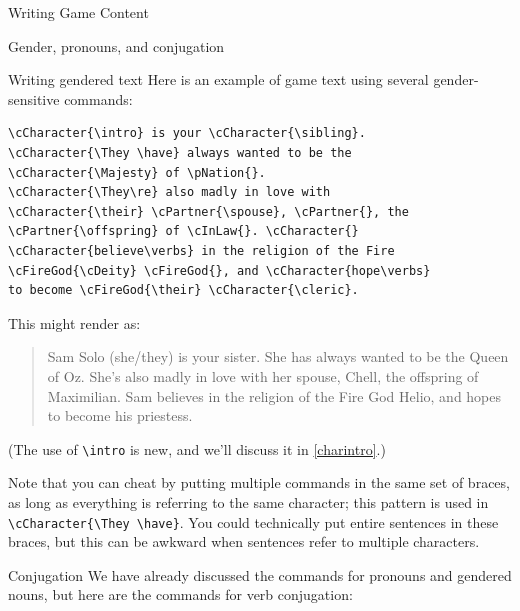 \documentclass[sheet]{GameTexBase}
\begin{document}
\begin{section}{Writing Game Content}
\begin{subsection}{Gender, pronouns, and conjugation}
\begin{subsubsection}{Writing gendered text}
Here is an example of game text using several gender-sensitive commands:

\begin{verbatim}
\cCharacter{\intro} is your \cCharacter{\sibling}.
\cCharacter{\They \have} always wanted to be the
\cCharacter{\Majesty} of \pNation{}.  
\cCharacter{\They\re} also madly in love with 
\cCharacter{\their} \cPartner{\spouse}, \cPartner{}, the 
\cPartner{\offspring} of \cInLaw{}. \cCharacter{} 
\cCharacter{believe\verbs} in the religion of the Fire
\cFireGod{\cDeity} \cFireGod{}, and \cCharacter{hope\verbs}
to become \cFireGod{\their} \cCharacter{\cleric}.
\end{verbatim} 

This might render as:

\begin{quote}
Sam Solo (she/they) is your sister.  She has always wanted to be the Queen of Oz.  She's also madly in love with her spouse, Chell, the offspring of Maximilian.  Sam believes in the religion of the Fire God Helio, and hopes to become his priestess.
\end{quote}

(The use of \lstinline|\intro| is new, and we'll discuss it in \ref{charintro}.)

Note that you can cheat by putting multiple commands in the same set of braces, as long as everything is referring to the same character; this pattern is used in \lstinline|\cCharacter{\They \have}|.  You could technically put entire sentences in these braces, but this can be awkward when sentences refer to multiple characters.
\end{subsubsection}
\begin{subsubsection}{Conjugation}
We have already discussed the commands for pronouns and gendered nouns, but here are the commands for verb conjugation:


\end{subsubsection}
\end{subsection}
\end{section}
\end{document}
